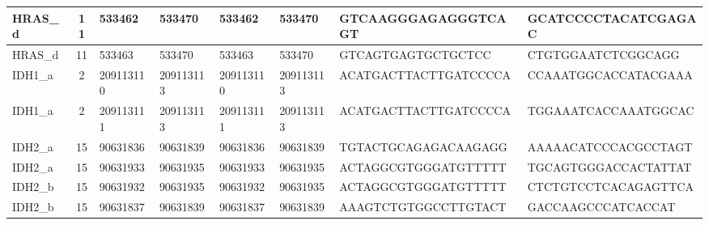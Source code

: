 \begin{landscape}
\begin{longtable}{| p{} | p{} | p{} | p{} | p{} | p{} | p{} | p{} |}
\multicolumn{1}{|l|}{HRAS\_d}    & \multicolumn{1}{c|}{11} & \multicolumn{1}{l|}{533462}    & \multicolumn{1}{l|}{533470}    & \multicolumn{1}{l|}{533462}    & \multicolumn{1}{l|}{533470}    & \multicolumn{1}{l|}{GTCAAGGGAGAGGGTCAGT}             & \multicolumn{1}{l|}{GCATCCCCTACATCGAGAC}           \\ \hline
\multicolumn{1}{|l|}{HRAS\_d}    & \multicolumn{1}{c|}{11} & \multicolumn{1}{l|}{533463}    & \multicolumn{1}{l|}{533470}    & \multicolumn{1}{l|}{533463}    & \multicolumn{1}{l|}{533470}    & \multicolumn{1}{l|}{GTCAGTGAGTGCTGCTCC}              & \multicolumn{1}{l|}{CTGTGGAATCTCGGCAGG}            \\ \hline
\multicolumn{1}{|l|}{IDH1\_a}    & \multicolumn{1}{c|}{2}  & \multicolumn{1}{l|}{209113110} & \multicolumn{1}{l|}{209113113} & \multicolumn{1}{l|}{209113110} & \multicolumn{1}{l|}{209113113} & \multicolumn{1}{l|}{ACATGACTTACTTGATCCCCA}           & \multicolumn{1}{l|}{CCAAATGGCACCATACGAAA}          \\ \hline
\multicolumn{1}{|l|}{IDH1\_a}    & \multicolumn{1}{c|}{2}  & \multicolumn{1}{l|}{209113111} & \multicolumn{1}{l|}{209113113} & \multicolumn{1}{l|}{209113111} & \multicolumn{1}{l|}{209113113} & \multicolumn{1}{l|}{ACATGACTTACTTGATCCCCA}           & \multicolumn{1}{l|}{TGGAAATCACCAAATGGCAC}          \\ \hline
\multicolumn{1}{|l|}{IDH2\_a}    & \multicolumn{1}{c|}{15} & \multicolumn{1}{l|}{90631836}  & \multicolumn{1}{l|}{90631839}  & \multicolumn{1}{l|}{90631836}  & \multicolumn{1}{l|}{90631839}  & \multicolumn{1}{l|}{TGTACTGCAGAGACAAGAGG}            & \multicolumn{1}{l|}{AAAAACATCCCACGCCTAGT}          \\ \hline
\multicolumn{1}{|l|}{IDH2\_a}    & \multicolumn{1}{c|}{15} & \multicolumn{1}{l|}{90631933}  & \multicolumn{1}{l|}{90631935}  & \multicolumn{1}{l|}{90631933}  & \multicolumn{1}{l|}{90631935}  & \multicolumn{1}{l|}{ACTAGGCGTGGGATGTTTTT}            & \multicolumn{1}{l|}{TGCAGTGGGACCACTATTAT}          \\ \hline
\multicolumn{1}{|l|}{IDH2\_b}    & \multicolumn{1}{c|}{15} & \multicolumn{1}{l|}{90631932}  & \multicolumn{1}{l|}{90631935}  & \multicolumn{1}{l|}{90631932}  & \multicolumn{1}{l|}{90631935}  & \multicolumn{1}{l|}{ACTAGGCGTGGGATGTTTTT}            & \multicolumn{1}{l|}{CTCTGTCCTCACAGAGTTCA}          \\ \hline
\multicolumn{1}{|l|}{IDH2\_b}    & \multicolumn{1}{c|}{15} & \multicolumn{1}{l|}{90631837}  & \multicolumn{1}{l|}{90631839}  & \multicolumn{1}{l|}{90631837}  & \multicolumn{1}{l|}{90631839}  & \multicolumn{1}{l|}{AAAGTCTGTGGCCTTGTACT}            & \multicolumn{1}{l|}{GACCAAGCCCATCACCAT}            \\ \hline

\end{longtable}
\end{landscape}
